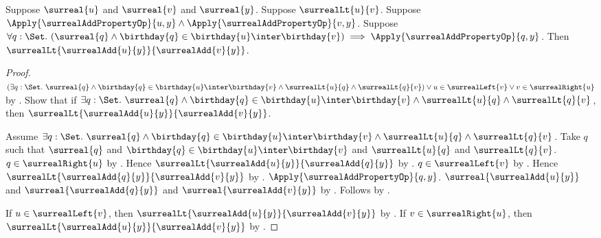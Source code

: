 \begin{lemma}\label{surreal_add_first_monotone_from_properties}
    Suppose $\surreal{u}$ and $\surreal{v}$ and $\surreal{y}$.
    Suppose $\surrealLt{u}{v}$.
    Suppose $\Apply{\surrealAddPropertyOp}{u,y}
        \land\Apply{\surrealAddPropertyOp}{v,y}$.
    Suppose $\forall q:\Set.\ (\surreal{q}\land
        \birthday{q}\in\birthday{u}\inter\birthday{v})\implies
        \Apply{\surrealAddPropertyOp}{q,y}$.
    Then $\surrealLt{\surrealAdd{u}{y}}{\surrealAdd{v}{y}}$.
\end{lemma}
\begin{proof}
    $(\exists q:\Set.\ \surreal{q}\land
            \birthday{q}\in\birthday{u}\inter\birthday{v}\land
            \surrealLt{u}{q}\land\surrealLt{q}{v})
        \lor u\in\surrealLeft{v}
        \lor v\in\surrealRight{u}$
        by .
    Show that if $\exists q:\Set.\ \surreal{q}\land
            \birthday{q}\in\birthday{u}\inter\birthday{v}\land
            \surrealLt{u}{q}\land\surrealLt{q}{v}$, then
        $\surrealLt{\surrealAdd{u}{y}}{\surrealAdd{v}{y}}$.
    \begin{subproof}
        Assume $\exists q:\Set.\ \surreal{q}\land
            \birthday{q}\in\birthday{u}\inter\birthday{v}\land
            \surrealLt{u}{q}\land\surrealLt{q}{v}$.
        Take $q$ such that $\surreal{q}$ and
            $\birthday{q}\in\birthday{u}\inter\birthday{v}$ and
            $\surrealLt{u}{q}$ and $\surrealLt{q}{v}$.
        $q\in\surrealRight{u}$
            by .
        Hence $\surrealLt{\surrealAdd{u}{y}}{\surrealAdd{q}{y}}$
            by .
        $q\in\surrealLeft{v}$
            by .
        Hence $\surrealLt{\surrealAdd{q}{y}}{\surrealAdd{v}{y}}$
            by .
        $\Apply{\surrealAddPropertyOp}{q,y}$.
        $\surreal{\surrealAdd{u}{y}}$ and
            $\surreal{\surrealAdd{q}{y}}$ and
            $\surreal{\surrealAdd{v}{y}}$
            by .
        Follows by .
    \end{subproof}
    If $u\in\surrealLeft{v}$, then
        $\surrealLt{\surrealAdd{u}{y}}{\surrealAdd{v}{y}}$
        by .
    If $v\in\surrealRight{u}$, then
        $\surrealLt{\surrealAdd{u}{y}}{\surrealAdd{v}{y}}$
        by .
\end{proof}

